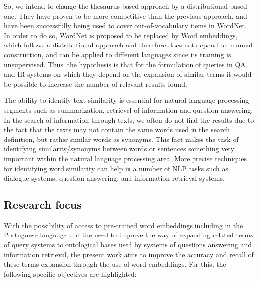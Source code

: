 So, we intend to change the thesaurus-based approach by a distributional-based one. They have proven to be more competitive than the previous approach, and have been successfully being used to cover out-of-vocabulary items in WordNet. \cite{Agirre2009}.
In order to do so, WordNet is proposed to be replaced by Word embeddings, which follows a distributional approach and therefore does not depend on manual construction, and can be applied to different languages since its training is unsupervised. Thus, the hypothesis is that for the formulation of queries in QA and IR systems on which they depend on the expansion of similar terms it would be possible to increase the number of relevant results found.

The ability to identify text similarity is essential for natural language processing segments such as summarization, retrieval of information and question answering. In the search of information through texts, we often do not find the results due to the fact that the texts may not contain the same words used in the search definition, but rather similar words as synonyms. This fact makes the task of identifying similarity/synonyms between words or sentences something very important within the natural language processing area. More precise techniques for identifying word similarity can help in a number of NLP tasks such as dialogue systems, question answering, and information retrieval systems. \cite{Islam2007ApplicationsOC, Pilehvar2013, Agirre2009}


\subsection{Research focus}

With the possibility of access to pre-trained word embeddings including in the Portuguese language and the need to improve the way of expanding related terms of query systems to ontological bases used by systems of questions answering and information retrieval, the present work aims to improve the accuracy and recall of these terms expansion through the use of word embeddings. For this, the following specific objectives are highlighted:

